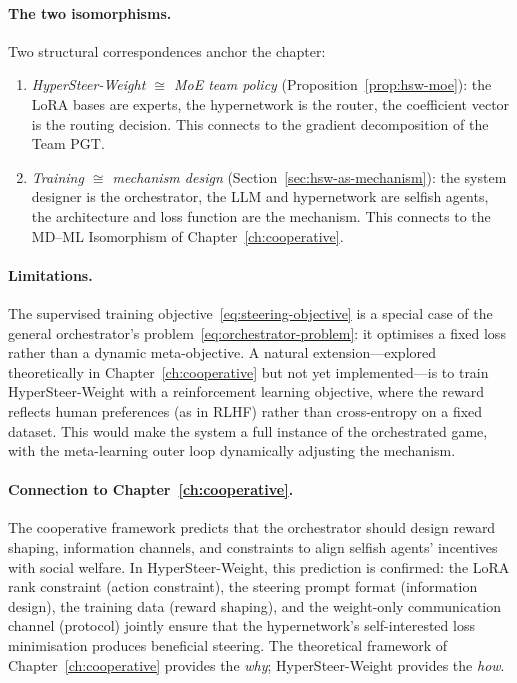 \paragraph{The two isomorphisms.} Two structural correspondences anchor the chapter:
\begin{enumerate}[label=(\roman*)]
  \item \emph{HyperSteer-Weight $\cong$ MoE team policy} (Proposition~\ref{prop:hsw-moe}): the LoRA bases are experts, the hypernetwork is the router, the coefficient vector is the routing decision. This connects to the gradient decomposition of the Team PGT.
  \item \emph{Training $\cong$ mechanism design} (Section~\ref{sec:hsw-as-mechanism}): the system designer is the orchestrator, the LLM and hypernetwork are selfish agents, the architecture and loss function are the mechanism. This connects to the MD--ML Isomorphism of Chapter~\ref{ch:cooperative}.
\end{enumerate}

\paragraph{Limitations.} The supervised training objective~\eqref{eq:steering-objective} is a special case of the general orchestrator's problem~\eqref{eq:orchestrator-problem}: it optimises a fixed loss rather than a dynamic meta-objective. A natural extension---explored theoretically in Chapter~\ref{ch:cooperative} but not yet implemented---is to train HyperSteer-Weight with a reinforcement learning objective, where the reward reflects human preferences (as in RLHF) rather than cross-entropy on a fixed dataset. This would make the system a full instance of the orchestrated game, with the meta-learning outer loop dynamically adjusting the mechanism.

\paragraph{Connection to Chapter~\ref{ch:cooperative}.} The cooperative framework predicts that the orchestrator should design reward shaping, information channels, and constraints to align selfish agents' incentives with social welfare. In HyperSteer-Weight, this prediction is confirmed: the LoRA rank constraint (action constraint), the steering prompt format (information design), the training data (reward shaping), and the weight-only communication channel (protocol) jointly ensure that the hypernetwork's self-interested loss minimisation produces beneficial steering. The theoretical framework of Chapter~\ref{ch:cooperative} provides the \emph{why}; HyperSteer-Weight provides the \emph{how}.
